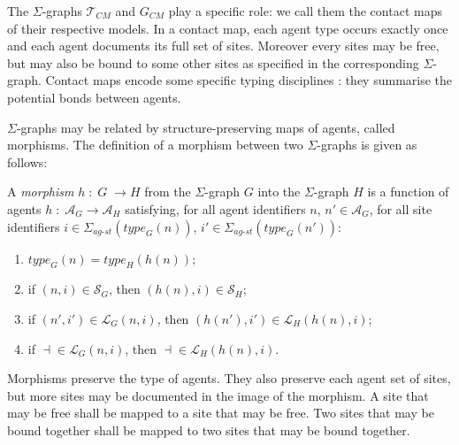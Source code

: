 \documentclass{entcs}
\newcommand{\freesymbol}{\dashv}
\newcommand{\graphsymb}{G}
\newcommand{\linksite}{\signaturesymb_{\textit{ag-st}}}
\newcommand{\signaturesymb}{\Sigma}
\newcommand{\agents}[1][\graphsymb]{\mathcal{A}_{#1}}
\newcommand{\type}[1][\graphsymb]{\textit{type}_{#1}}
\newcommand{\sites}[1][\graphsymb]{\mathcal{S}_{#1}}
\newcommand{\links}[1][\graphsymb]{\mathcal{L}_{#1}}
\begin{document}
The $\Sigma$-graphs $\mathcal{T}_{\textit{CM}}$ and $\graphsymb_{\textit{CM}}$ play a specific role: we call them the contact maps of their respective models. In a contact map, each agent type occurs exactly once and each agent documents its full set of sites.  Moreover every sites may be free, but may also be bound to some other sites as specified in the corresponding $\Sigma$-graph. Contact maps encode some  specific typing disciplines \cite{DBLP:journals/mscs/DanosHW13}: they summarise the potential bonds between agents.


$\Sigma$-graphs may be related by structure-preserving maps of agents, called morphisms. The definition of a morphism between two $\Sigma$-graphs  is given as follows:
\begin{defn}[morphisms]
 A \emph{morphism} $h\;:\;G\;\rightarrow H$ from the $\Sigma$-graph $G$ into the $\Sigma$-graph $H$ is a function of agents $h\;:\;\agents[G]\rightarrow \agents[H]$ satisfying,
for all agent identifiers $n$, $n'\in\agents[G]$, for all site identifiers $i\in\linksite(\type[G](n))$, $i'\in\linksite(\type[G](n'))$:
\begin{enumerate}
\item $\type[G](n) = \type[H](h(n))$;
\item if $(n,i)\in\sites[G]$, then $(h(n), i)\in\sites[H]$;
\item if $(n',i')\in\links[G](n,i)$, then $(h(n'),i')\in\links[H](h(n),i)$;
\item if \;$\freesymbol{ }\in\links[G](n,i)$, then \;$\freesymbol{ }\in\links[H](h(n),i)$.
\end{enumerate}
\end{defn}

Morphisms preserve the type of agents.
They also preserve each agent set of sites, but more sites may be documented in the image of the morphism. A site that may be free shall be mapped to a site that may be free. Two sites that may be bound together shall be mapped to two sites that may be bound together.
\end{document}
